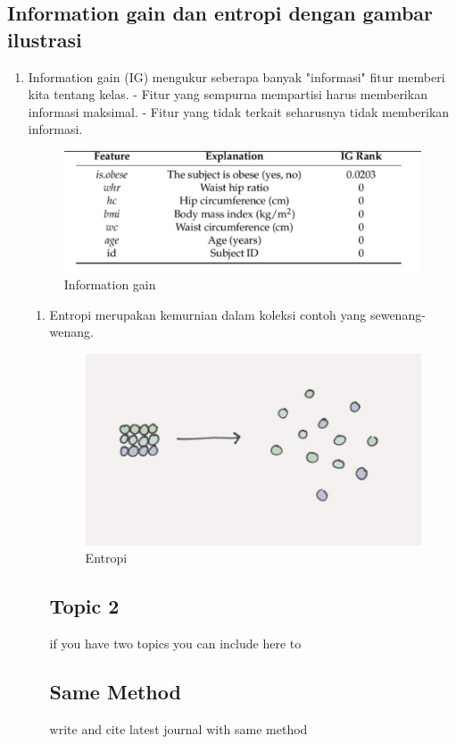 \begin{enumerate}
\begin{enumerate}
\begin{enumerate}
\begin{enumerate}
\begin{enumerate}
\begin{enumerate}
\begin{enumerate}
\begin{enumerate}
\begin{enumerate}
\begin{enumerate}
\begin{enumerate}
\begin{enumerate}
\subsection{Information gain dan entropi dengan gambar ilustrasi}
\begin{enumerate}
\item Information gain (IG) mengukur seberapa banyak "informasi" fitur memberi kita tentang kelas. - Fitur yang sempurna mempartisi harus memberikan informasi maksimal. - Fitur yang tidak terkait seharusnya tidak memberikan informasi.
\begin{figure}[ht]
\centering
\includegraphics[scale=0.5]{figures/f7.jpg}
\caption{Information gain}
\label{contoh}
\end{figure}
\begin{enumerate}
\item Entropi merupakan kemurnian dalam koleksi contoh yang sewenang-wenang.
\begin{figure}[ht]
\centering
\includegraphics[scale=0.5]{figures/f8.jpg}
\caption{Entropi}
\label{contoh}
\end{figure}

\subsection{Topic 2}
if you have two topics you can include here to


\section{Same Method}
write and cite latest journal with same method


\end{enumerate}
\end{enumerate}
\end{enumerate}
\end{enumerate}
\end{enumerate}
\end{enumerate}
\end{enumerate}
\end{enumerate}
\end{enumerate}
\end{enumerate}
\end{enumerate}
\end{enumerate}
\end{enumerate}
\end{enumerate}
